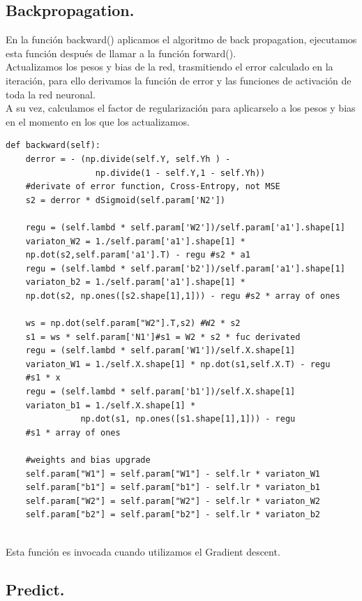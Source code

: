 \documentclass[a4paper,10pt]{article}
\begin{document}
\subsection{Backpropagation.}

En la función backward() aplicamos el algoritmo de back propagation, ejecutamos esta función después de llamar a la función forward(). \\Actualizamos los pesos y bias de la red, trasmitiendo el error calculado en la iteración, para ello derivamos la función de error y las funciones de activación de toda la red neuronal. \\A su vez, calculamos el factor de regularización para aplicarselo a los pesos y bias en el momento en los que los actualizamos.
\begin{lstlisting}
def backward(self):
    derror = - (np.divide(self.Y, self.Yh ) - 
                  np.divide(1 - self.Y,1 - self.Yh))
    #derivate of error function, Cross-Entropy, not MSE
    s2 = derror * dSigmoid(self.param['N2']) 

    regu = (self.lambd * self.param['W2'])/self.param['a1'].shape[1]
    variaton_W2 = 1./self.param['a1'].shape[1] *
    np.dot(s2,self.param['a1'].T) - regu #s2 * a1
    regu = (self.lambd * self.param['b2'])/self.param['a1'].shape[1]
    variaton_b2 = 1./self.param['a1'].shape[1] * 
    np.dot(s2, np.ones([s2.shape[1],1])) - regu #s2 * array of ones

    ws = np.dot(self.param["W2"].T,s2) #W2 * s2                    
    s1 = ws * self.param['N1']#s1 = W2 * s2 * fuc derivated      
    regu = (self.lambd * self.param['W1'])/self.X.shape[1]
    variaton_W1 = 1./self.X.shape[1] * np.dot(s1,self.X.T) - regu
    #s1 * x
    regu = (self.lambd * self.param['b1'])/self.X.shape[1]
    variaton_b1 = 1./self.X.shape[1] * 
               np.dot(s1, np.ones([s1.shape[1],1])) - regu 
    #s1 * array of ones 
    
    #weights and bias upgrade
    self.param["W1"] = self.param["W1"] - self.lr * variaton_W1 
    self.param["b1"] = self.param["b1"] - self.lr * variaton_b1 
    self.param["W2"] = self.param["W2"] - self.lr * variaton_W2 
    self.param["b2"] = self.param["b2"] - self.lr * variaton_b2
        
\end{lstlisting}
Esta función es invocada cuando utilizamos el Gradient descent.
\subsection{Predict.}
\end{document}
